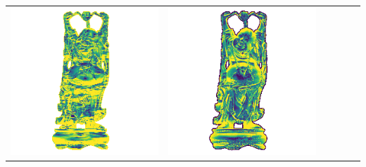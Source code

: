 \begin{center}
\begin{tabularx}{\linewidth}{@{}Y@{}Y@{}Y@{}Y@{}Y@{}Y@{}}
\includegraphics[width=\linewidth]{semisynthetic/20150514_20_yu_err.png} &
\includegraphics[width=\linewidth]{semisynthetic/20150514_20_dpsn_err.png} &

\end{tabularx}
\end{center}
